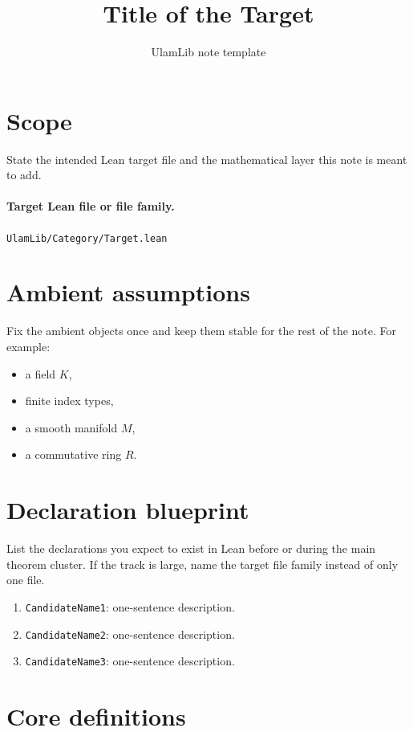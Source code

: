 \documentclass[11pt]{article}
\title{Title of the Target}
\author{UlamLib note template}
\date{}
\begin{document}
\maketitle

\section{Scope}

State the intended Lean target file and the mathematical layer this note is
meant to add.

\paragraph{Target Lean file or file family.}
\texttt{UlamLib/Category/Target.lean}

\section{Ambient assumptions}

Fix the ambient objects once and keep them stable for the rest of the note.
For example:

\begin{itemize}
\item a field $K$,
\item finite index types,
\item a smooth manifold $M$,
\item a commutative ring $R$.
\end{itemize}

\section{Declaration blueprint}

List the declarations you expect to exist in Lean before or during the main
theorem cluster. If the track is large, name the target file family instead of
only one file.

\begin{enumerate}
\item \texttt{CandidateName1}: one-sentence description.
\item \texttt{CandidateName2}: one-sentence description.
\item \texttt{CandidateName3}: one-sentence description.
\end{enumerate}

\section{Core definitions}
\end{document}
